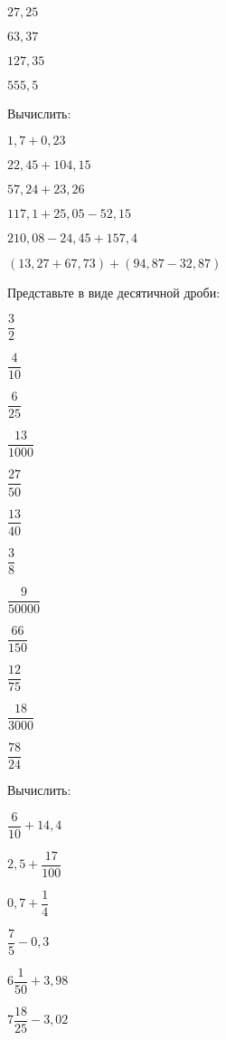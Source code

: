 \begin{class}[number=2]
\begin{listofex}
\begin{enumcols}[itemcolumns=6]
				\item \( 27,25 \)
				\item \( 63,37 \)
				\item \( 127,35 \)
				\item \( 555,5 \)
			\end{enumcols}
			\item Вычислить:
			\begin{enumcols}[itemcolumns=3]
				\item \( 1,7+0,23 \)
				\item \( 22,45+104,15 \)
				\item \( 57,24+23,26 \)
				\item \( 117,1+25,05-52,15 \)
				\item \( 210,08-24,45+157,4 \)
				\item \( (13,27+67,73)+(94,87-32,87) \)
			\end{enumcols}
			\item Представьте в виде десятичной дроби:
			\begin{enumcols}[itemcolumns=4]
				\item \( \dfrac{3}{2} \)
				\item \( \dfrac{4}{10} \)
				\item \( \dfrac{6}{25} \)
				\item \( \dfrac{13}{1000} \)
				\item \( \dfrac{27}{50} \)
				\item \( \dfrac{13}{40} \)
				\item \( \dfrac{3}{8} \)
				\item \( \dfrac{9}{50000} \)
				\item \( \dfrac{66}{150}\)
				\item \( \dfrac{12}{75} \)
				\item \( \dfrac{18}{3000} \)
				\item \( \dfrac{78}{24} \)
			\end{enumcols}
			\item Вычислить:
			\begin{enumcols}[itemcolumns=6]
				\item \( \dfrac{6}{10}+14,4 \)
				\item \( 2,5+\dfrac{17}{100} \)
				\item \( 0,7+\dfrac{1}{4} \)
				\item \( \dfrac{7}{5}-0,3\)
				\item \( 6\dfrac{1}{50}+3,98 \)
				\item \( 7\dfrac{18}{25}-3,02 \)
			\end{enumcols}

\end{listofex}
\end{class}
